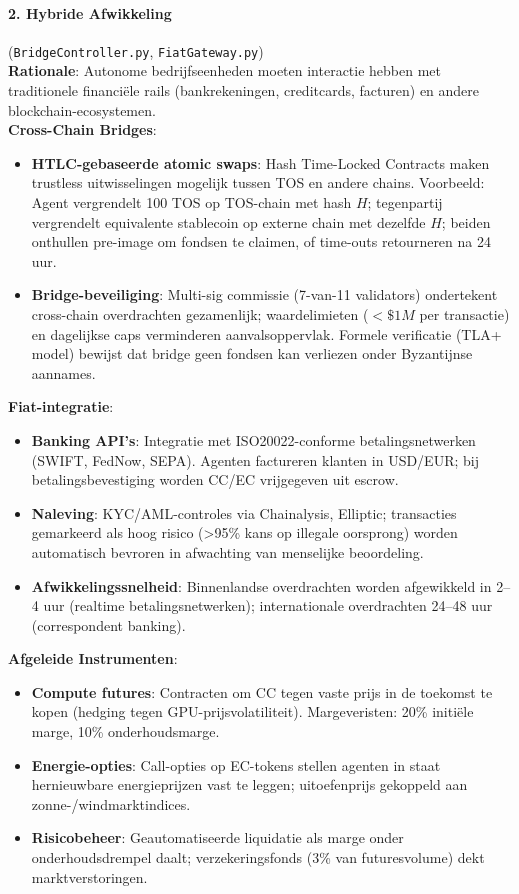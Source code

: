 \documentclass[11pt]{article}
\begin{document}
\paragraph{2. Hybride Afwikkeling} (\texttt{BridgeController.py}, \texttt{FiatGateway.py})\\
\textbf{Rationale}: Autonome bedrijfseenheden moeten interactie hebben met traditionele financiële rails (bankrekeningen, creditcards, facturen) en andere blockchain-ecosystemen.\\
\textbf{Cross-Chain Bridges}:
\begin{itemize}[noitemsep]
  \item \textbf{HTLC-gebaseerde atomic swaps}: Hash Time-Locked Contracts maken trustless uitwisselingen mogelijk tussen TOS en andere chains. Voorbeeld: Agent vergrendelt 100 TOS op TOS-chain met hash $H$; tegenpartij vergrendelt equivalente stablecoin op externe chain met dezelfde $H$; beiden onthullen pre-image om fondsen te claimen, of time-outs retourneren na 24 uur.
  \item \textbf{Bridge-beveiliging}: Multi-sig commissie (7-van-11 validators) ondertekent cross-chain overdrachten gezamenlijk; waardelimieten ($<\$1M$ per transactie) en dagelijkse caps verminderen aanvalsoppervlak. Formele verificatie (TLA+ model) bewijst dat bridge geen fondsen kan verliezen onder Byzantijnse aannames.
\end{itemize}
\textbf{Fiat-integratie}:
\begin{itemize}[noitemsep]
  \item \textbf{Banking API's}: Integratie met ISO20022-conforme betalingsnetwerken (SWIFT, FedNow, SEPA). Agenten factureren klanten in USD/EUR; bij betalingsbevestiging worden CC/EC vrijgegeven uit escrow.
  \item \textbf{Naleving}: KYC/AML-controles via Chainalysis, Elliptic; transacties gemarkeerd als hoog risico (>95\% kans op illegale oorsprong) worden automatisch bevroren in afwachting van menselijke beoordeling.
  \item \textbf{Afwikkelingssnelheid}: Binnenlandse overdrachten worden afgewikkeld in 2--4 uur (realtime betalingsnetwerken); internationale overdrachten 24--48 uur (correspondent banking).
\end{itemize}
\textbf{Afgeleide Instrumenten}:
\begin{itemize}[noitemsep]
  \item \textbf{Compute futures}: Contracten om CC tegen vaste prijs in de toekomst te kopen (hedging tegen GPU-prijsvolatiliteit). Margeveristen: 20\% initiële marge, 10\% onderhoudsmarge.
  \item \textbf{Energie-opties}: Call-opties op EC-tokens stellen agenten in staat hernieuwbare energieprijzen vast te leggen; uitoefenprijs gekoppeld aan zonne-/windmarktindices.
  \item \textbf{Risicobeheer}: Geautomatiseerde liquidatie als marge onder onderhoudsdrempel daalt; verzekeringsfonds (3\% van futuresvolume) dekt marktverstoringen.
\end{itemize}
\end{document}
